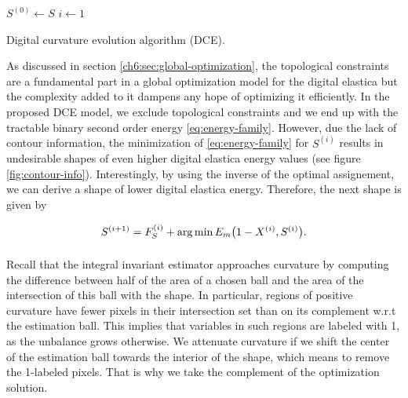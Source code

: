 \begin{algorithm}
 
 \BlankLine
 $S^{(0)} \longleftarrow S$\;
 $i \longleftarrow 1$\;
 \caption{Digital curvature evolution algorithm (DCE).}
 \label{alg:evolution-model}  
\end{algorithm}


As discussed in section \ref{ch6:sec:global-optimization}, the topological constraints are a fundamental part in a global optimization model for the digital elastica but the complexity added to it dampens any hope of optimizing it efficiently. In the proposed DCE model, we exclude topological constraints and we end up with the tractable binary second order energy \eqref{eq:energy-family}. However, due the lack of contour information, the minimization of \eqref{eq:energy-family} for $S^{(i)}$ results in undesirable shapes of even higher digital elastica energy values  (see figure \ref{fig:contour-info}). Interestingly, by using the inverse of the optimal assignement, we can derive a shape of lower digital elastica energy. Therefore, the next shape is given by

\begin{align*}
	S^{(i+1)} = F_{S}^{(i)} + \operatorname*{arg\,min} _{}{E_m\big(1-X^{(i)},S^{(i)}} \big).
\end{align*}

Recall that the integral invariant estimator approaches curvature by computing the difference between half of the area
of a chosen ball and the area of the intersection of this ball with the shape.  In particular, regions of positive
curvature have fewer pixels in their intersection set than on its complement w.r.t the estimation ball. This implies
that variables in such regions are labeled with 1, as the unbalance grows otherwise. We attenuate curvature if we shift
the center of the estimation ball towards the interior of the shape, which means to remove the 1-labeled pixels. That is
why we take the complement of the optimization solution.


